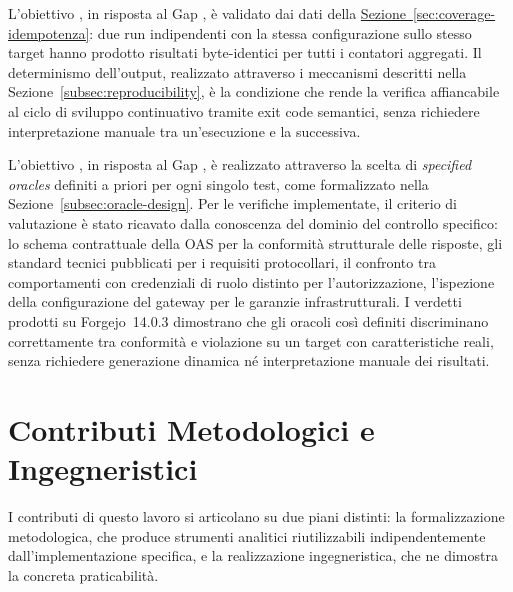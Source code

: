 L'obiettivo , in risposta al Gap , è validato dai dati della \hyperref[sec:coverage-idempotenza]{Sezione~\ref*{sec:coverage-idempotenza}}: due run indipendenti con la stessa configurazione sullo stesso target hanno prodotto risultati byte-identici per tutti i contatori aggregati. Il determinismo dell'output, realizzato attraverso i meccanismi descritti nella Sezione~\ref{subsec:reproducibility}, è la condizione che rende la verifica affiancabile al ciclo di sviluppo continuativo tramite exit code semantici, senza richiedere interpretazione manuale tra un'esecuzione e la successiva.

L'obiettivo , in risposta al Gap , è realizzato attraverso la scelta di \emph{specified oracles} definiti a priori per ogni singolo test, come formalizzato nella Sezione~\ref{subsec:oracle-design}. Per le verifiche implementate, il criterio di valutazione è stato ricavato dalla conoscenza del dominio del controllo specifico: lo schema contrattuale della \gls{OAS} per la conformità strutturale delle risposte, gli standard tecnici pubblicati per i requisiti protocollari, il confronto tra comportamenti con credenziali di ruolo distinto per l'autorizzazione, l'ispezione della configurazione del gateway per le garanzie infrastrutturali. I verdetti prodotti su Forgejo~14.0.3 dimostrano che gli oracoli così definiti discriminano correttamente tra conformità e violazione su un target con caratteristiche reali, senza richiedere generazione dinamica né interpretazione manuale dei risultati.

\section{Contributi Metodologici e Ingegneristici}%
\label{sec:contributi}

I contributi di questo lavoro si articolano su due piani distinti: la formalizzazione metodologica, che produce strumenti analitici riutilizzabili indipendentemente dall'implementazione specifica, e la realizzazione ingegneristica, che ne dimostra la concreta praticabilità.

